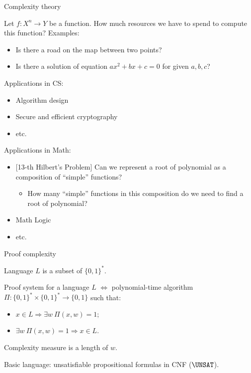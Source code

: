 \begin{frame}{Complexity theory}

    Let $f\colon X^n \to Y$ be a function. How much resources we have to spend to compute this function?
    \pause
    Examples:
    \begin{itemize}
        \item Is there a road on the map between two points?
        \item Is there a solution of equation $a x^2 + b x + c = 0$ for given $a, b, c$?
    \end{itemize}

    \pause

    Applications in CS:
    \begin{itemize}
        \item Algorithm design
        \item Secure and efficient cryptography
        \item etc.
    \end{itemize}


    \pause
    Applications in Math:
    \begin{itemize}
        \item{} [13-th Hilbert's Problem] Can we represent a root of polynomial as a composition of
            ``simple'' functions?
            \begin{itemize}
                \item How many ``simple'' functions in this composition do we need to find a root of
                    polynomial?
            \end{itemize}
        \item Math Logic
        \item etc.
    \end{itemize}
\end{frame}



\begin{frame}{Proof complexity}

    Language $L$ is a subset of $\{0, 1\}^*$.

    \begin{definition}
        Proof system for a language $L$ $\Leftrightarrow$ polynomial-time algorithm $\Pi\colon \{0,
        1\}^* \times \{0, 1\}^* \rightarrow \{0, 1\}$ such that:
        \begin{itemize}
            \item $x \in L \Rightarrow \exists w ~ \Pi(x, w) = 1$;
            \item $\exists w ~ \Pi(x, w) = 1 \Rightarrow x \in L$.
        \end{itemize}
    \end{definition}

    \pause

    Complexity measure is a length of $w$.

    \pause

    Basic language: unsatisfiable propositional formulas in CNF ($\UNSAT$).

\end{frame}


